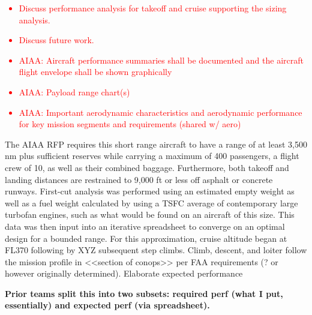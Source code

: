 \textcolor{red}{
\begin{itemize}
    \item Discuss performance analysis for takeoff and cruise supporting the sizing analysis.
    \item Discuss future work.
    \item AIAA: Aircraft performance summaries shall be documented and the aircraft flight envelope
    shall be shown graphically
    \item AIAA: Payload range chart(s)
    \item AIAA: Important aerodynamic characteristics and aerodynamic performance for key mission
    segments and requirements (shared w/ aero)
\end{itemize}}

The AIAA RFP \cite{RFP} requires this short range aircraft to have a range of at least 3,500 nm plus sufficient reserves while carrying a maximum of 400 passengers, a flight crew of 10, as well as their combined baggage.  Furthermore, both takeoff and landing distances are restrained to 9,000 ft or less off asphalt or concrete runways.  First-cut analysis was performed using an estimated empty weight as well as a fuel weight calculated by using a TSFC average of contemporary large turbofan engines, such as what would be found on an aircraft of this size.  This data was then input into an iterative spreadsheet to converge on an optimal design for a bounded range.  For this approximation, cruise altitude began at FL370 following by XYZ subsequent step climbs.  Climb, descent, and loiter follow the mission profile in <<section of conops>> per FAA requirements (? or however originally determined).  Elaborate expected performance

\textbf{Prior teams split this into two subsets: required perf (what I put, essentially) and expected perf (via spreadsheet).}